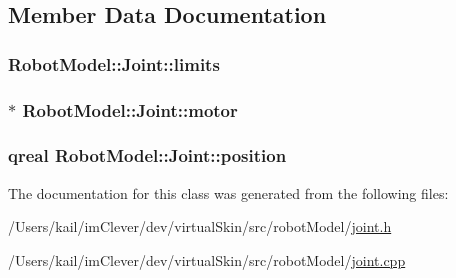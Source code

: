\subsection{Member Data Documentation}
\hypertarget{class_robot_model_1_1_joint_a3991756cd74729b87bde02b679c95b4c}{
\subsubsection[{limits}]{ {\bf RobotModel::Joint::limits}}}
\label{class_robot_model_1_1_joint_a3991756cd74729b87bde02b679c95b4c}
\hypertarget{class_robot_model_1_1_joint_a9fe40b0c9b6562d7a4cce3dd8715f945}{
\subsubsection[{motor}]{$\ast$ {\bf RobotModel::Joint::motor}}}
\label{class_robot_model_1_1_joint_a9fe40b0c9b6562d7a4cce3dd8715f945}
\hypertarget{class_robot_model_1_1_joint_aada2db465b0f51975a3c928656a9924c}{
\subsubsection[{position}]{\setlength{\rightskip}{0pt plus 5cm}qreal {\bf RobotModel::Joint::position}}}
\label{class_robot_model_1_1_joint_aada2db465b0f51975a3c928656a9924c}


The documentation for this class was generated from the following files:\begin{DoxyCompactItemize}
\item 
/Users/kail/imClever/dev/virtualSkin/src/robotModel/\hyperlink{joint_8h}{joint.h}\item 
/Users/kail/imClever/dev/virtualSkin/src/robotModel/\hyperlink{joint_8cpp}{joint.cpp}\end{DoxyCompactItemize}
